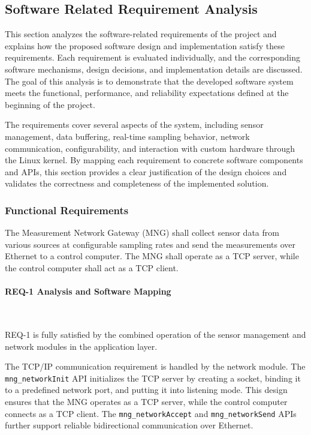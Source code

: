 \newpage
\subsection{Software Related Requirement Analysis }
This section analyzes the software-related requirements of the project and explains 
how the proposed software design and implementation satisfy these requirements. 
Each requirement is evaluated individually, and the corresponding software 
mechanisms, design decisions, and implementation details are discussed. The goal 
of this analysis is to demonstrate that the developed software system meets the 
functional, performance, and reliability expectations defined at the beginning of 
the project.

The requirements cover several aspects of the system, including sensor management, 
data buffering, real-time sampling behavior, network communication, configurability, 
and interaction with custom hardware through the Linux kernel. By mapping each 
requirement to concrete software components and APIs, this section provides a clear 
justification of the design choices and validates the correctness and completeness 
of the implemented solution.

\subsubsection{Functional Requirements}


\begin{tcolorbox}[
    title=REQ-1,
    colback=gray!5,
    colframe=black,
    fonttitle=\bfseries
]
The Measurement Network Gateway (MNG) shall collect sensor data from various
sources at configurable sampling rates and send the measurements over Ethernet
to a control computer. The MNG shall operate as a TCP server, while the control
computer shall act as a TCP client.
\end{tcolorbox}


\paragraph{REQ-1 Analysis and Software Mapping}\

REQ-1 is fully satisfied by the combined operation of the sensor management and 
network modules in the application layer.

The TCP/IP communication requirement is handled by the network module. The 
\texttt{mng\_networkInit} API initializes the TCP server by creating a socket, binding it to 
a predefined network port, and putting it into listening mode. This design ensures 
that the MNG operates as a TCP server, while the control computer connects as a TCP 
client. The \texttt{mng\_networkAccept} and \texttt{mng\_networkSend} APIs further support reliable 
bidirectional communication over Ethernet.


